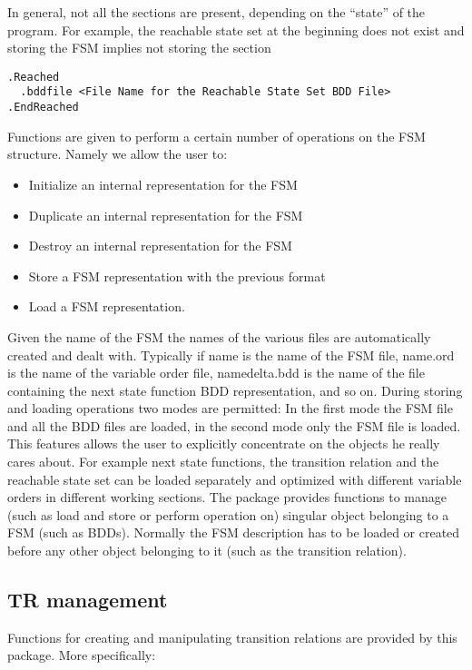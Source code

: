 In general, not all the sections are present, depending on the ``state''
of the program.
For example, the reachable state set at the beginning does not exist and
storing the FSM implies not storing the section
{\small
\begin{verbatim}
.Reached
  .bddfile <File Name for the Reachable State Set BDD File>
.EndReached
\end{verbatim}
}

Functions are given to perform a certain number of operations on the
FSM structure.
Namely we allow the user to:
\begin{itemize}
\item
Initialize an internal representation for the FSM
\item
Duplicate an internal representation for the FSM
\item
Destroy an internal representation for the FSM
\item
Store a FSM representation with the previous format
\item
Load a FSM representation.
\end{itemize}
Given the name of the FSM the names of the various files are automatically
created and dealt with.
Typically if {\sf name} is the name of the FSM file, {\sf name.ord} is the
name of the variable order file, {\sf namedelta.bdd} is the name of the file
containing the next state function BDD representation, and so on.
During storing and loading operations two modes are permitted: In the first
mode the FSM file and all the BDD files are loaded, in the second mode only the
FSM file is loaded.
This features allows the user to explicitly concentrate on the objects
he really cares about.
For example next state functions, the transition relation and the reachable
state set can be loaded separately and optimized with different variable
orders in different working sections.
The package provides functions to manage (such as load and store or perform
operation on) singular object belonging to a FSM (such as BDDs).
Normally the FSM description has to be loaded or created before any other
object belonging to it (such as the transition relation).


\subsection{TR management}

Functions for creating and manipulating transition relations are provided by
this package.
More specifically:


